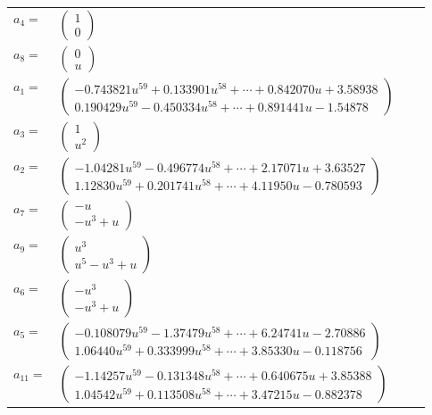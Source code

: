 \documentclass[1p]{elsarticle_modified}
\theoremstyle{definition}
\begin{document}
\begin{tabular}{m{7pt} m{180pt} m{7pt} m{180pt} }
\flushright $a_{4}=$&$\begin{pmatrix}1\\0\end{pmatrix}$ \\
\flushright $a_{8}=$&$\begin{pmatrix}0\\u\end{pmatrix}$ \\
\flushright $a_{1}=$&$\begin{pmatrix}-0.743821 u^{59}+0.133901 u^{58}+\cdots+0.842070 u+3.58938\\0.190429 u^{59}-0.450334 u^{58}+\cdots+0.891441 u-1.54878\end{pmatrix}$ \\
\flushright $a_{3}=$&$\begin{pmatrix}1\\u^2\end{pmatrix}$ \\
\flushright $a_{2}=$&$\begin{pmatrix}-1.04281 u^{59}-0.496774 u^{58}+\cdots+2.17071 u+3.63527\\1.12830 u^{59}+0.201741 u^{58}+\cdots+4.11950 u-0.780593\end{pmatrix}$ \\
\flushright $a_{7}=$&$\begin{pmatrix}- u\\- u^3+u\end{pmatrix}$ \\
\flushright $a_{9}=$&$\begin{pmatrix}u^3\\u^5- u^3+u\end{pmatrix}$ \\
\flushright $a_{6}=$&$\begin{pmatrix}- u^3\\- u^3+u\end{pmatrix}$ \\
\flushright $a_{5}=$&$\begin{pmatrix}-0.108079 u^{59}-1.37479 u^{58}+\cdots+6.24741 u-2.70886\\1.06440 u^{59}+0.333999 u^{58}+\cdots+3.85330 u-0.118756\end{pmatrix}$ \\
\flushright $a_{11}=$&$\begin{pmatrix}-1.14257 u^{59}-0.131348 u^{58}+\cdots+0.640675 u+3.85388\\1.04542 u^{59}+0.113508 u^{58}+\cdots+3.47215 u-0.882378\end{pmatrix}$ \\

\end{tabular}
\end{document}
